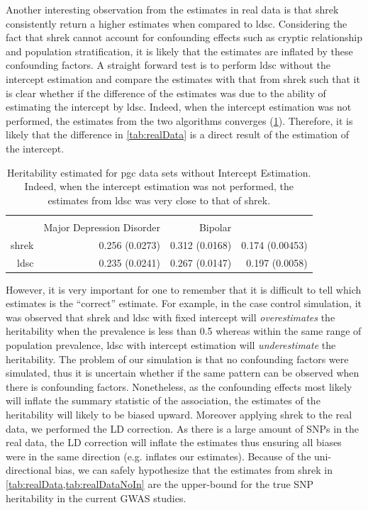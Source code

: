 	Another interesting observation from the estimates in real data is that \gls{shrek} consistently return a higher estimates when compared to \gls{ldsc}.
	Considering the fact that \gls{shrek} cannot account for confounding effects such as cryptic relationship and population stratification, it is likely that the estimates are inflated by these confounding factors.
	A straight forward test is to perform \gls{ldsc} without the intercept estimation and compare the estimates with that from \gls{shrek} such that it is clear whether if the difference of the estimates was due to the ability of estimating the intercept by \gls{ldsc}.
	Indeed, when the intercept estimation was not performed, the estimates from the two algorithms converges (\cref{tab:realDataNoIn}).
	Therefore, it is likely that the difference in \cref{tab:realData} is a direct result of the estimation of the intercept.
	 \begin{table}
	 	\centering
	 	\begin{tabular}{rrrr}
	 		\toprule
	 		\\
	 		& Major Depression Disorder & Bipolar & \Glng{scz}\\
	 		\midrule
	 		\gls{shrek}   & 0.256 (0.0273)  & 0.312 (0.0168)  & 0.174 (0.00453) \\
	 		\gls{ldsc}   & 0.235 (0.0241) & 0.267 (0.0147) & 0.197 (0.0058)\\
	 		\bottomrule
	 	\end{tabular}
	 	\caption[Heritability Estimated for PGC Data Sets without Intercept Estimation]{			
	 		Heritability estimated for \gls{pgc} data sets without Intercept Estimation.
	 		Indeed, when the intercept estimation was not performed, the estimates from \gls{ldsc} was very close to that of \gls{shrek}. 
	 	}
	 	\label{tab:realDataNoIn}
	 \end{table}
	 
	However, it is very important for one to remember that it is difficult to tell which estimates is the ``correct'' estimate.
	For example, in the case control simulation, it was observed that \gls{shrek} and \gls{ldsc} with fixed intercept will \emph{overestimates} the heritability when the prevalence is less than 0.5 whereas within the same range of population prevalence, \gls{ldsc} with intercept estimation will \emph{underestimate} the heritability.
	The problem of our simulation is that no confounding factors were simulated, thus it is uncertain whether if the same pattern can be observed when there is confounding factors.
	Nonetheless, as the confounding effects most likely will inflate the summary statistic of the association, the estimates of the heritability will likely to be biased upward.
	Moreover applying \gls{shrek} to the real data, we performed the \gls{LD} correction.
	As there is a large amount of \glspl{SNP} in the real data, the \gls{LD} correction will inflate the estimates thus ensuring all biases were in the same direction (e.g. inflates our estimates).
	Because of the uni-directional bias, we can safely hypothesize that the estimates from \gls{shrek} in \cref{tab:realData,tab:realDataNoIn} are the upper-bound for the true \gls{SNP} heritability in the current \gls{GWAS} studies.
	
